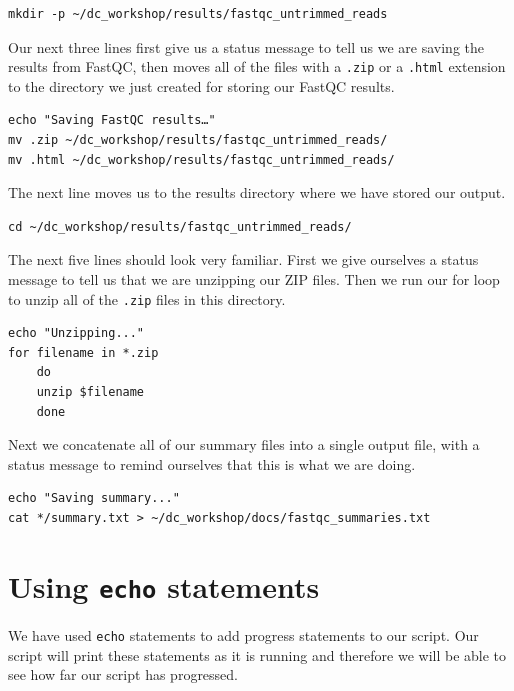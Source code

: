 \documentclass[
  letterpaper,
  DIV=11,
  numbers=noendperiod]{scrreprt}
\begin{document}
\begin{verbatim}
mkdir -p ~/dc_workshop/results/fastqc_untrimmed_reads
\end{verbatim}

Our next three lines first give us a status message to tell us we are
saving the results from FastQC, then moves all of the files with a
\texttt{.zip} or a \texttt{.html} extension to the directory we just
created for storing our FastQC results.

\begin{verbatim}
echo "Saving FastQC results…" 
mv .zip ~/dc_workshop/results/fastqc_untrimmed_reads/ 
mv .html ~/dc_workshop/results/fastqc_untrimmed_reads/
\end{verbatim}

The next line moves us to the results directory where we have stored our
output.

\begin{verbatim}
cd ~/dc_workshop/results/fastqc_untrimmed_reads/
\end{verbatim}

The next five lines should look very familiar. First we give ourselves a
status message to tell us that we are unzipping our ZIP files. Then we
run our for loop to unzip all of the \texttt{.zip} files in this
directory.

\begin{verbatim}
echo "Unzipping..."
for filename in *.zip
    do
    unzip $filename
    done
\end{verbatim}

Next we concatenate all of our summary files into a single output file,
with a status message to remind ourselves that this is what we are
doing.

\begin{verbatim}
echo "Saving summary..."
cat */summary.txt > ~/dc_workshop/docs/fastqc_summaries.txt
\end{verbatim}

\hypertarget{using-echo-statements}{%
\section{\texorpdfstring{Using \texttt{echo}
statements}{Using echo statements}}\label{using-echo-statements}}

We have used \texttt{echo} statements to add progress statements to our
script. Our script will print these statements as it is running and
therefore we will be able to see how far our script has progressed.
\end{document}
